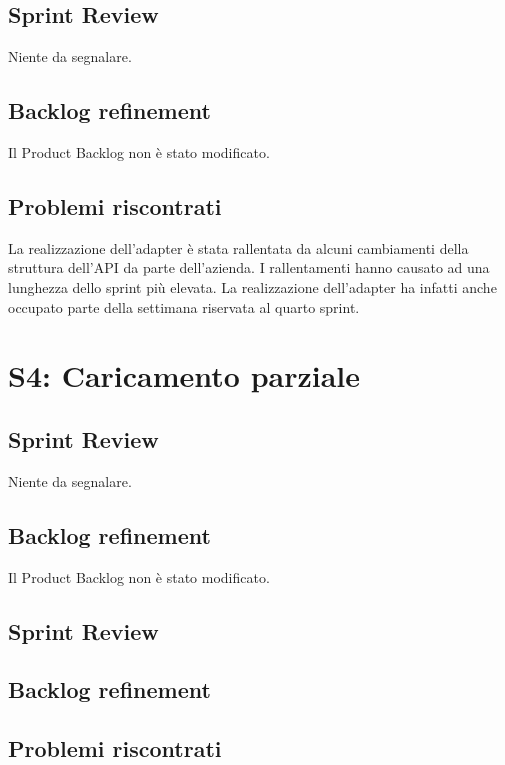 \subsection{Sprint Review}
Niente da segnalare.

\subsection{Backlog refinement}
Il Product Backlog non è stato modificato.

\subsection{Problemi riscontrati}
La realizzazione dell'adapter è stata rallentata da alcuni cambiamenti della struttura dell'API da parte dell'azienda. I rallentamenti hanno causato ad una lunghezza dello sprint più elevata. La realizzazione dell'adapter ha infatti anche occupato parte della settimana riservata al quarto sprint.

\newpage

\section{S4: Caricamento parziale}
\subsection{Sprint Review}
Niente da segnalare.

\subsection{Backlog refinement}
Il Product Backlog non è stato modificato.

\subsection{Sprint Review}
\subsection{Backlog refinement}
\subsection{Problemi riscontrati}

